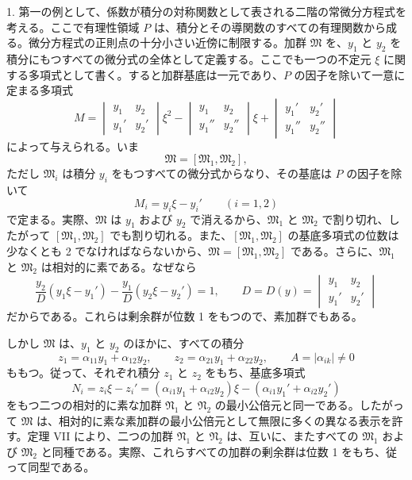 \documentclass[11pt]{article}
\begin{document}
1. 第一の例として、係数が積分の対称関数として表される二階の常微分方程式を考える。ここで有理性領域 $P$ は、積分とその導関数のすべての有理関数から成る。微分方程式の正則点の十分小さい近傍に制限する。加群 $\mathfrak M$ を、$y_1$ と $y_2$ を積分にもつすべての微分式の全体として定義する。ここでも一つの不定元 $\xi$ に関する多項式として書く。すると加群基底は一元であり、$P$ の因子を除いて一意に定まる多項式
\[
 M=
 \begin{vmatrix} y_1&y_2\\ y_1'&y_2'\end{vmatrix}\xi^2
 -\begin{vmatrix} y_1&y_2\\ y_1''&y_2''\end{vmatrix}\xi
 +\begin{vmatrix} y_1'&y_2'\\ y_1''&y_2''\end{vmatrix}
\]
によって与えられる。いま
\begin{equation}
 \mathfrak M=[\mathfrak M_1,
\mathfrak M_2],
\tag{41}
\end{equation}
ただし $\mathfrak M_i$ は積分 $y_i$ をもつすべての微分式からなり、その基底は $P$ の因子を除いて
\[
 M_i=y_i\xi-y_i'
 \qquad(i=1,2)
\]
で定まる。実際、$\mathfrak M$ は $y_1$ および $y_2$ で消えるから、$\mathfrak M_1$ と $\mathfrak M_2$ で割り切れ、したがって $[\mathfrak M_1,\mathfrak M_2]$ でも割り切れる。また、$[\mathfrak M_1,\mathfrak M_2]$ の基底多項式の位数は少なくとも 2 でなければならないから、$\mathfrak M=[\mathfrak M_1,\mathfrak M_2]$ である。さらに、$\mathfrak M_1$ と $\mathfrak M_2$ は相対的に素である。なぜなら
\begin{equation}
 \frac{y_2}{D}(y_1\xi-y_1')-\frac{y_1}{D}(y_2\xi-y_2')=1,
 \qquad
 D=D(y)=\begin{vmatrix}y_1&y_2\\ y_1'&y_2'\end{vmatrix}
\tag{42}
\end{equation}
だからである。これらは剰余群が位数 1 をもつので、素加群でもある。

しかし $\mathfrak M$ は、$y_1$ と $y_2$ のほかに、すべての積分
\[
 z_1=\alpha_{11}y_1+\alpha_{12}y_2,
 \qquad
 z_2=\alpha_{21}y_1+\alpha_{22}y_2,
 \qquad
 A=|\alpha_{ik}|\ne0
\]
ももつ。従って、それぞれ積分 $z_1$ と $z_2$ をもち、基底多項式
\[
 N_i=z_i\xi-z_i'=(\alpha_{i1}y_1+\alpha_{i2}y_2)\xi-(\alpha_{i1}y_1'+\alpha_{i2}y_2')
\]
をもつ二つの相対的に素な加群 $\mathfrak N_1$ と $\mathfrak N_2$ の最小公倍元と同一である。したがって $\mathfrak M$ は、相対的に素な素加群の最小公倍元として無限に多くの異なる表示を許す。定理 VII により、二つの加群 $\mathfrak N_1$ と $\mathfrak N_2$ は、互いに、またすべての $\mathfrak M_1$ および $\mathfrak M_2$ と同種である。実際、これらすべての加群の剰余群は位数 1 をもち、従って同型である。
\end{document}
